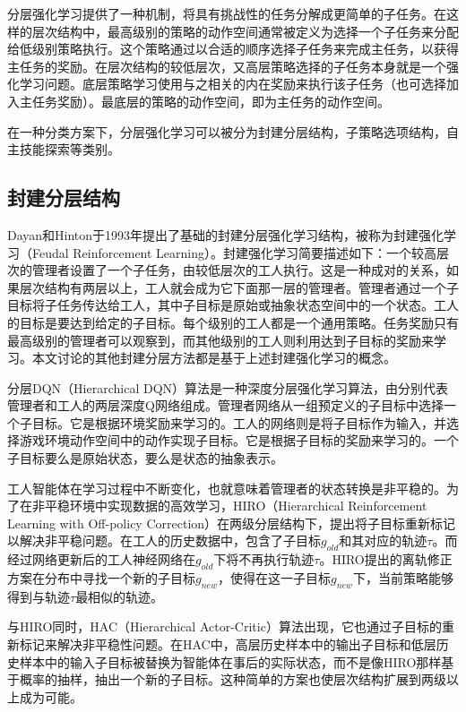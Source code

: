 分层强化学习提供了一种机制，将具有挑战性的任务分解成更简单的子任务。在这样的层次结构中，最高级别的策略的动作空间通常被定义为选择一个子任务来分配给低级别策略执行。这个策略通过以合适的顺序选择子任务来完成主任务，以获得主任务的奖励。在层次结构的较低层次，又高层策略选择的子任务本身就是一个强化学习问题。底层策略学习使用与之相关的内在奖励来执行该子任务（也可选择加入主任务奖励）。最底层的策略的动作空间，即为主任务的动作空间。

在一种分类方案下，分层强化学习可以被分为封建分层结构，子策略选项结构，自主技能探索等类别。

\subsection{封建分层结构}

Dayan和Hinton于1993年提出了基础的封建分层强化学习结构\cite{NIPS1992_d14220ee}，被称为封建强化学习（Feudal Reinforcement Learning）。封建强化学习简要描述如下：一个较高层次的管理者设置了一个子任务，由较低层次的工人执行。这是一种成对的关系，如果层次结构有两层以上，工人就会成为它下面那一层的管理者。管理者通过一个子目标将子任务传达给工人，其中子目标是原始或抽象状态空间中的一个状态。工人的目标是要达到给定的子目标。每个级别的工人都是一个通用策略。任务奖励只有最高级别的管理者可以观察到，而其他级别的工人则利用达到子目标的奖励来学习。本文讨论的其他封建分层方法都是基于上述封建强化学习的概念。

分层DQN（Hierarchical DQN）\cite{kulkarni2016hierarchical}算法是一种深度分层强化学习算法，由分别代表管理者和工人的两层深度Q网络组成。管理者网络从一组预定义的子目标中选择一个子目标。它是根据环境奖励来学习的。工人的网络则是将子目标作为输入，并选择游戏环境动作空间中的动作实现子目标。它是根据子目标的奖励来学习的。一个子目标要么是原始状态，要么是状态的抽象表示。

工人智能体在学习过程中不断变化，也就意味着管理者的状态转换是非平稳的。为了在非平稳环境中实现数据的高效学习，HIRO（Hierarchical Reinforcement Learning with Off-policy Correction）\cite{nachum2018data}在两级分层结构下，提出将子目标重新标记以解决非平稳问题。在工人的历史数据中，包含了子目标$g_{old}$和其对应的轨迹$\tau$。而经过网络更新后的工人神经网络在$g_{old}$下将不再执行轨迹$\tau$。HIRO提出的离轨修正方案在分布中寻找一个新的子目标$g_{new}$，使得在这一子目标$g_{new}$下，当前策略能够得到与轨迹$\tau$最相似的轨迹。

与HIRO同时，HAC（Hierarchical Actor-Critic）\cite{levy2017learning}算法出现，它也通过子目标的重新标记来解决非平稳性问题。在HAC中，高层历史样本中的输出子目标和低层历史样本中的输入子目标被替换为智能体在事后\cite{andrychowicz2017hindsight}的实际状态，而不是像HIRO那样基于概率的抽样，抽出一个新的子目标。这种简单的方案也使层次结构扩展到两级以上成为可能。

